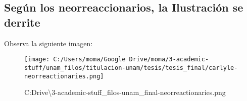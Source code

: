 \documentclass[
]{article}
\begin{document}
\hypertarget{seguxfan-los-neorreaccionarios-la-ilustraciuxf3n-se-derrite}{%
\subsection{Según los neorreaccionarios, la Ilustración se
derrite}\label{seguxfan-los-neorreaccionarios-la-ilustraciuxf3n-se-derrite}}

Observa la siguiente imagen:

\begin{figure}
\centering
\texttt{[image: C:/Users/moma/Google Drive/moma/3-academic-stuff/unam\_filos/titulacion-unam/tesis/tesis\_final/carlyle-neorreactionaries.png]}
\caption{C:\Users\moma\Google Drive\moma\textbackslash3-academic-stuff\unam\_filos\titulacion-unam\tesis\tesis\_final\carlyle-neorreactionaries.png}
\end{figure}
\end{document}
